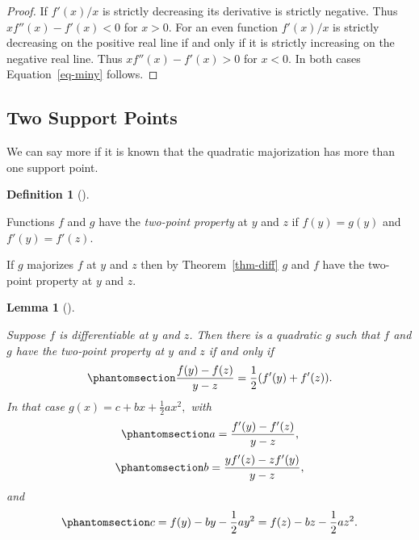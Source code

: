\documentclass[
  12pt,
  letterpaper,
  DIV=11,
  numbers=noendperiod]{scrartcl}
\theoremstyle{definition}
\newtheorem{definition}{Definition}[section]
\theoremstyle{definition}
\theoremstyle{plain}
\theoremstyle{plain}
\theoremstyle{plain}
\newtheorem{lemma}{Lemma}[section]
\theoremstyle{remark}
\begin{document}
\begin{proof}
If \(f'(x)/x\) is strictly decreasing its derivative is strictly
negative. Thus \(xf''(x)-f'(x)<0\) for \(x>0\). For an even function
\(f'(x)/x\) is strictly decreasing on the positive real line if and only
if it is strictly increasing on the negative real line. Thus
\(xf''(x)-f'(x)>0\) for \(x<0\). In both cases Equation~\ref{eq-miny}
follows.
\end{proof}

\subsection{Two Support Points}\label{sec-twosupport}

We can say more if it is known that the quadratic majorization has more
than one support point.

\begin{definition}[]\protect\hypertarget{def-twop}{}\label{def-twop}

Functions \(f\) and \(g\) have the \emph{two-point property} at \(y\)
and \(z\) if \(f(y)=g(y)\) and \(f'(y)=f'(z)\).

\end{definition}

If \(g\) majorizes \(f\) at \(y\) and \(z\) then by
Theorem~\ref{thm-diff} \(g\) and \(f\) have the two-point property at
\(y\) and \(z\).

\begin{lemma}[]\protect\hypertarget{lem-twop}{}\label{lem-twop}

Suppose \(f\) is differentiable at \(y\) and \(z\). Then there is a
quadratic \(g\) such that \(f\) and \(g\) have the two-point property at
\(y\) and \(z\) if and only if
\begin{equation}\phantomsection\label{eq-qtp}{
\frac{f(y)-f(z)}{y-z}=\frac12(f'(y)+f'(z)).
}\end{equation} In that case \(g(x)=c+bx+\frac12ax^2,\) with
\begin{equation}\phantomsection\label{eq-afunc}{
a=\frac{f'(y)-f'(z)}{y-z},
}\end{equation} \begin{equation}\phantomsection\label{eq-bfunc}{
b=\frac{yf'(z)-zf'(y)}{y-z},
}\end{equation} and \begin{equation}\phantomsection\label{eq-cfunc}{
c=f(y)-by-\frac12ay^2=f(z)-bz-\frac12az^2.
}\end{equation}

\end{lemma}
\end{document}
